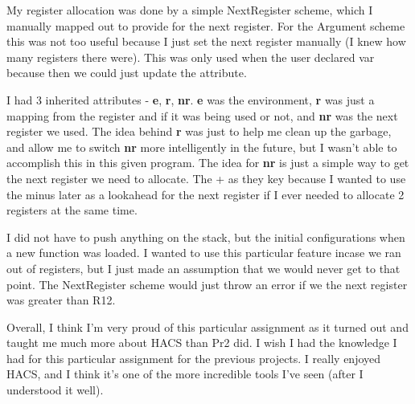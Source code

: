 \documentclass[11pt, oneside]{article}
\begin{document}
\par My register allocation was done by a simple NextRegister scheme, which I manually mapped out to provide for the next register. For the Argument scheme this was not too useful because I just set the next register manually (I knew how many registers there were). This was only used when the user declared var because then we could just update the attribute. 

\par I had 3 inherited attributes - \textbf{e}, \textbf{r}, \textbf{nr}. \textbf{e} was the environment, \textbf{r} was just a mapping from the register and if it was being used or not, and \textbf{nr} was the next register we used. The idea behind \textbf{r} was just to help me clean up the garbage, and allow me to switch \textbf{nr} more intelligently in the future, but I wasn't able to accomplish this in this given program. The idea for \textbf{nr} is just a simple way to get the next register we need to allocate. The + as they key because I wanted to use the minus later as a lookahead for the next register if I ever needed to allocate 2 registers at the same time. 

\par I did not have to push anything on the stack, but the initial configurations when a new function was loaded. I wanted to use this particular feature incase we ran out of registers, but I just made an assumption that we would never get to that point. The NextRegister scheme would just throw an error if we the next register was greater than R12. 

\par Overall, I think I'm very proud of this particular assignment as it turned out and taught me much more about HACS than Pr2 did. I wish I had the knowledge I had for this particular assignment for the previous projects. I really enjoyed HACS, and I think it's one of the more incredible tools I've seen (after I understood it well).
\end{document}
